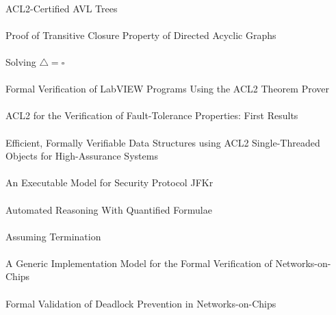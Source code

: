 \documentclass{article}
\begin{document}
\cite{09-ralston-avl} \\
{ACL2}-Certified {AVL} Trees \\

\cite{09-fraij-dags} \\
Proof of Transitive Closure Property of Directed Acyclic Graphs \\

\cite{09-cowles-solving} \\
Solving $\triangle = \square$ \\

\cite{09-kaufmann-labview} \\
Formal Verification of {LabVIEW} Programs Using the {ACL2} Theorem Prover \\

\cite{09-pierre-properties} \\
{ACL2} for the Verification of Fault-Tolerance Properties: First Results \\

\cite{09-hardin-stobjs} \\
Efficient, Formally Verifiable Data Structures using {ACL2} Single-Threaded Objects for High-Assurance Systems \\

\cite{09-rager-jfkr} \\
An Executable Model for Security Protocol {JFKr} \\

\cite{09-greve-quantified} \\
Automated Reasoning With Quantified Formulae \\

\cite{09-greve-termination} \\
Assuming Termination \\

\cite{09-van-der-broek-model} \\
A Generic Implementation Model for the Formal Verification of Networks-on-Chips \\

\cite{09-verbeek} \\
Formal Validation of Deadlock Prevention in Networks-on-Chips \\
\end{document}

